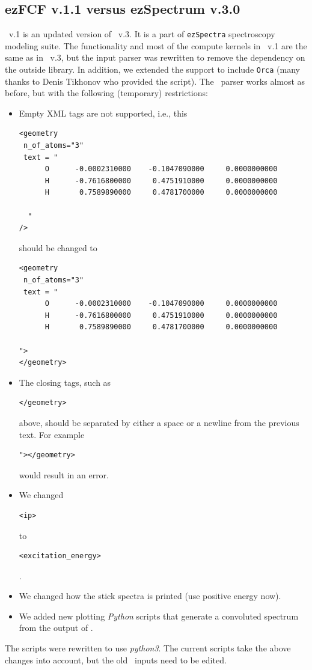\documentclass[11pt]{article}
\begin{document}
\subsection*{ezFCF v.1.1 versus ezSpectrum v.3.0}
\ezFCF\ v.1 is an updated version of \ezS\ v.3. It is a part of \texttt{ezSpectra} spectroscopy
modeling suite\cite{Gozem:2021:ezSpectra}.  The functionality 
and most of the compute kernels in \ezFCF\ v.1
are the same as in \ezS\ v.3, 
but the input parser was rewritten to remove the dependency on the outside library. In addition, we extended
the support to include {\tt Orca} (many thanks to Denis Tikhonov who provided the script). 
The \xml\ parser  works almost as before, but with the following (temporary) restrictions:
  \begin{itemize}
  \item Empty XML tags are not supported, i.e., this
    \renewcommand{\baselinestretch}{1.0}
\begin{verbatim}
<geometry
 n_of_atoms="3"
 text = "
      O      -0.0002310000    -0.1047090000     0.0000000000
      H      -0.7616800000     0.4751910000     0.0000000000
      H       0.7589890000     0.4781700000     0.0000000000

  "
/>
\end{verbatim}
should be changed to
\begin{verbatim}
<geometry
 n_of_atoms="3"
 text = "
      O      -0.0002310000    -0.1047090000     0.0000000000
      H      -0.7616800000     0.4751910000     0.0000000000
      H       0.7589890000     0.4781700000     0.0000000000

">
</geometry>
\end{verbatim}
\renewcommand{\baselinestretch}{1.5}
\item The closing tags, such as \begin{verbatim}</geometry>\end{verbatim} above, should be separated by either a space or a newline from the previous text. For example  \begin{verbatim}"></geometry>\end{verbatim} would result in an error.
\item We changed  \begin{verbatim}<ip>\end{verbatim} to \begin{verbatim}<excitation_energy>\end{verbatim}. 
\item We changed how the stick spectra is printed (use positive energy now). 
\item We added new plotting {\sl Python} scripts that generate a convoluted spectrum from the output of \ezFCF.
  \end{itemize}    
  The scripts were rewritten to use {\sl python3}. The current scripts take the above changes into account, but the old \xml\ inputs need to be edited. 
\end{document}
